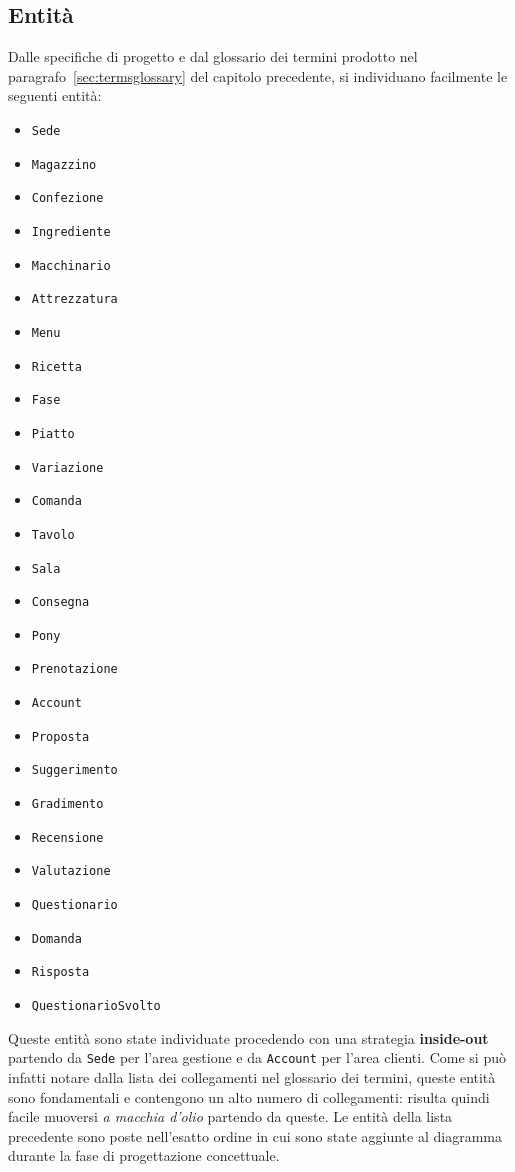 \subsection{Entità}
Dalle specifiche di progetto e dal glossario dei termini prodotto nel
paragrafo~\vref{sec:termsglossary} del capitolo precedente, si individuano facilmente
le seguenti entità:
\begin{multicols}{3}
\begin{itemize}
    \item\tt Sede
    \item\tt Magazzino
    \item\tt Confezione
    \item\tt Ingrediente
    \item\tt Macchinario
    \item\tt Attrezzatura
    \item\tt Menu
    \item\tt Ricetta
    \item\tt Fase
    \item\tt Piatto
    \item\tt Variazione
    \item\tt Comanda
    \item\tt Tavolo
    \item\tt Sala
    \item\tt Consegna
    \item\tt Pony
    \item\tt Prenotazione
\end{itemize}
\begin{itemize}
    \item\tt Account
    \item\tt Proposta
    \item\tt Suggerimento
    \item\tt Gradimento
    \item\tt Recensione
    \item\tt Valutazione
    \item\tt Questionario
    \item\tt Domanda
    \item\tt Risposta
    \item\tt QuestionarioSvolto
\end{itemize}
\end{multicols}
Queste entità sono state individuate procedendo con una strategia {\bf inside-out}
partendo da {\tt Sede} per l'area gestione e da {\tt Account} per l'area clienti. Come
si può infatti notare dalla lista dei collegamenti nel glossario dei termini, queste
entità sono fondamentali e contengono un alto numero di collegamenti: risulta quindi
facile muoversi {\it a macchia d'olio} partendo da queste.
Le entità della lista precedente sono poste nell'esatto ordine in cui sono state
aggiunte al diagramma durante la fase di progettazione concettuale.
